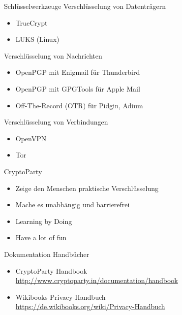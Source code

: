 \documentclass[aspectratio=1610]{beamer}
\begin{document}
  \begin{frame}{Schlüsselwerkzeuge}
    \pause
    Verschlüsselung von Datenträgern
    \begin{itemize}
      \pause
      \item TrueCrypt
      \pause
      \item LUKS (Linux)
    \end{itemize}
    \pause
    Verschlüsselung von Nachrichten
    \begin{itemize}
      \pause
      \item OpenPGP mit Enigmail für Thunderbird
      \pause
      \item OpenPGP mit GPGTools für Apple Mail
      \paus
      \item Off-The-Record (OTR) für Pidgin, Adium
    \end{itemize}
    \pause
    Verschlüsselung von Verbindungen
    \begin{itemize}
      \pause
      \item OpenVPN
      \pause
      \item Tor
    \end{itemize}
  \end{frame}

  \begin{frame}{CryptoParty}
    \begin{itemize}
      \item Zeige den Menschen praktische Verschlüsselung
      \pause
      \item Mache es unabhängig und barrierefrei
      \pause
      \item Learning by Doing
      \pause
      \item Have a lot of fun
    \end{itemize}
  \end{frame}
 
 \begin{frame}{Dokumentation}
    Handbücher
    \begin{itemize}
      \pause
      \item CryptoParty Handbook \\ \url{http://www.cryptoparty.in/documentation/handbook}
      \pause
      \item Wikibooks Privacy-Handbuch \\ \url{https://de.wikibooks.org/wiki/Privacy-Handbuch}
    \end{itemize}
  \end{frame}
\end{document}

